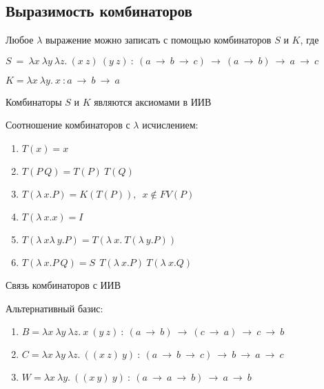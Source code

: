 	 \subsection{Выразимость комбинаторов}
	 \begin{statement}Любое $\lambda$ выражение можно записать с помощью комбинаторов $S$ и $K$, где\end{statement}
	 $S\:=\:\lambda x\:\lambda y\:\lambda z.\:(x\:z)\:(y\:z)\: : \:(a\:\rightarrow\:b\:\rightarrow\:c)\:\rightarrow\:(a\:\rightarrow\:b)\:\rightarrow\:a\:\rightarrow\:c$\par 
	 $K=\lambda x\:\lambda y.\:x\: : a\:\rightarrow\:b\:\rightarrow\:a$\par 
	 \begin{statement}Комбинаторы $S$ и $K$ являются аксиомами в ИИВ\end{statement}
	\begin{statement}Соотношение комбинаторов с $\lambda$ исчислением:\end{statement}
	\begin{enumerate}
		\item $T(x)=x$
		\item $T(P\:Q)=T(P)\:T(Q)$
		\item $T(\lambda\:x.P)=K(T(P)),\enspace x\not\in FV(P)$
		\item $T(\lambda\:x.x)=I$
		\item $T(\lambda\:x\lambda\:y.P)=T(\lambda\:x.\:T(\lambda\:y.P))$
		\item $T(\lambda\:x.P\:Q)=S\:\:T(\lambda\:x.P)\:T(\lambda\:x.Q)$
	\end{enumerate}		
	\begin{statement}Связь комбинаторов с ИИВ\end{statement}	
	\begin{statement}Альтернативный базис:\end{statement}
	 \begin{enumerate}
		\item $B=\lambda x\:\lambda y\:\lambda z.\:x\:(y\:z)\: : \:(a\:\rightarrow\:b)\:\rightarrow\:(c\:\rightarrow\:a)\:\rightarrow\:c\:\rightarrow\:b$
		\item $C=\lambda x\:\lambda y\:\lambda z.\:((x\:z)\:y)\: : \:(a\:\rightarrow\:b\:\rightarrow\:c)\:\rightarrow\:b\:\rightarrow\:a\:\rightarrow\:c$
		\item $W=\lambda x\:\lambda y.\:((x\:y)\:y)\: : \: (a\:\rightarrow\:a\:\rightarrow\:b)\:\rightarrow\:a\:\rightarrow\:b$
	 \end{enumerate}